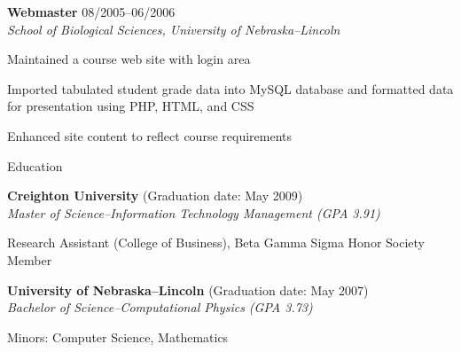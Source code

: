 \begin{itemize1}
	\item \textbf{Webmaster} \textopenbullet{} 08/2005--06/2006 \\
		\textit{School of Biological Sciences, University of Nebraska--Lincoln} \vspace{-1.5mm}
		\begin{itemize1}
			\item Maintained a course web site with login area
			\item Imported tabulated student grade data into MySQL database and formatted data for presentation using PHP, HTML, and CSS
			\item Enhanced site content to reflect course requirements 
		\end{itemize1}
\end{itemize1}

\begin{Large}\textsf{Education}\end{Large} \vspace{-2mm}

\begin{itemize1}
	\item \textbf{Creighton University} (Graduation date: May 2009) \\
		\textit{Master of Science--Information Technology Management (GPA 3.91)} \vspace{-1.5mm}
		\begin{itemize1}			
			\item Research Assistant (College of Business), Beta Gamma Sigma Honor Society Member
		\end{itemize1}
	\item \textbf{University of Nebraska--Lincoln} (Graduation date: May 2007) \\
		\textit{Bachelor of Science--Computational Physics (GPA 3.73)} \vspace{-1.5mm}
		\begin{itemize1}			
			\item Minors: Computer Science, Mathematics
		\end{itemize1}
\end{itemize1}
